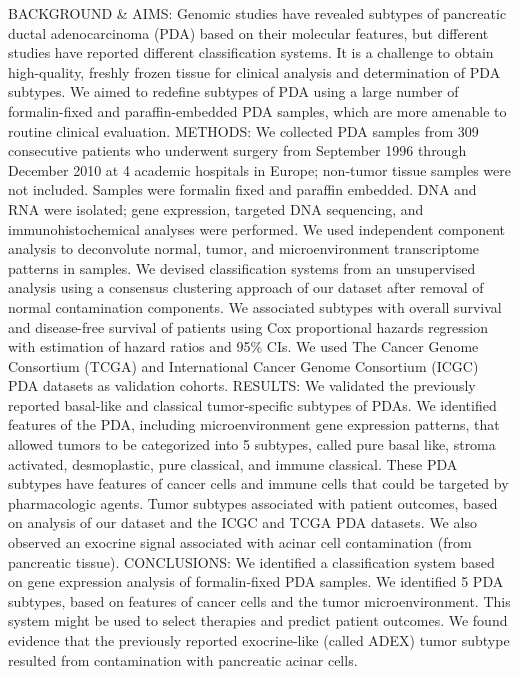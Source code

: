 \documentclass[]{article}
\begin{document}
BACKGROUND \& AIMS: Genomic studies have revealed subtypes of pancreatic
ductal adenocarcinoma (PDA) based on their molecular features, but
different studies have reported different classification systems. It is
a challenge to obtain high-quality, freshly frozen tissue for clinical
analysis and determination of PDA subtypes. We aimed to redefine
subtypes of PDA using a large number of formalin-fixed and
paraffin-embedded PDA samples, which are more amenable to routine
clinical evaluation. METHODS: We collected PDA samples from 309
consecutive patients who underwent surgery from September 1996 through
December 2010 at 4 academic hospitals in Europe; non-tumor tissue
samples were not included. Samples were formalin fixed and paraffin
embedded. DNA and RNA were isolated; gene expression, targeted DNA
sequencing, and immunohistochemical analyses were performed. We used
independent component analysis to deconvolute normal, tumor, and
microenvironment transcriptome patterns in samples. We devised
classification systems from an unsupervised analysis using a consensus
clustering approach of our dataset after removal of normal contamination
components. We associated subtypes with overall survival and
disease-free survival of patients using Cox proportional hazards
regression with estimation of hazard ratios and 95\% CIs. We used The
Cancer Genome Consortium (TCGA) and International Cancer Genome
Consortium (ICGC) PDA datasets as validation cohorts. RESULTS: We
validated the previously reported basal-like and classical
tumor-specific subtypes of PDAs. We identified features of the PDA,
including microenvironment gene expression patterns, that allowed tumors
to be categorized into 5 subtypes, called pure basal like, stroma
activated, desmoplastic, pure classical, and immune classical. These PDA
subtypes have features of cancer cells and immune cells that could be
targeted by pharmacologic agents. Tumor subtypes associated with patient
outcomes, based on analysis of our dataset and the ICGC and TCGA PDA
datasets. We also observed an exocrine signal associated with acinar
cell contamination (from pancreatic tissue). CONCLUSIONS: We identified
a classification system based on gene expression analysis of
formalin-fixed PDA samples. We identified 5 PDA subtypes, based on
features of cancer cells and the tumor microenvironment. This system
might be used to select therapies and predict patient outcomes. We found
evidence that the previously reported exocrine-like (called ADEX) tumor
subtype resulted from contamination with pancreatic acinar cells.
\end{document}
